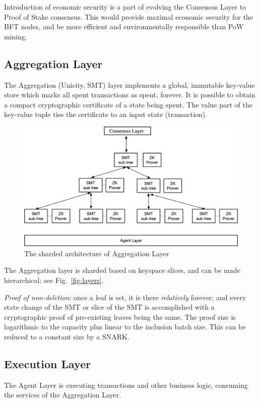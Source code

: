 \documentclass[twocolumn]{article}
\begin{document}
Introduction of economic security is a part of evolving the Consensus Layer to Proof of Stake consensus. This would provide maximal economic security for the BFT nodes, and be more efficient and environmentally responsible than PoW mining.

\subsection{Aggregation Layer}

The Aggregation (Unicity, SMT) layer implements a global, immutable key-value store which marks all spent transactions as spent, forever. It is possible to obtain a compact cryptographic certificate of a state being spent. The value part of the key-value tuple ties the certificate to an input state (transaction).

\begin{figure}[!t]
    \centering
    \includegraphics[width=.7\textwidth]{pic/layers}
    \caption{The sharded architecture of Aggregation Layer}\label{fig:sharding}
\end{figure}

The Aggregation layer is sharded based on keyspace slices, and can be made hierarchical: see Fig.~\ref{fig:layers}.

\emph{Proof of non-deletion}: once a leaf is set, it is there \emph{relatively} forever; and every state change of the SMT or slice of the SMT is accomplished with a cryptographic proof of pre-existing leaves being the same. The proof size is logarithmic to the capacity plus linear to the inclusion batch size. This can be reduced to a constant size by a SNARK.

\subsection{Execution Layer}

The Agent Layer is executing transactions and other business logic, consuming the services of the Aggregation Layer.
\end{document}
